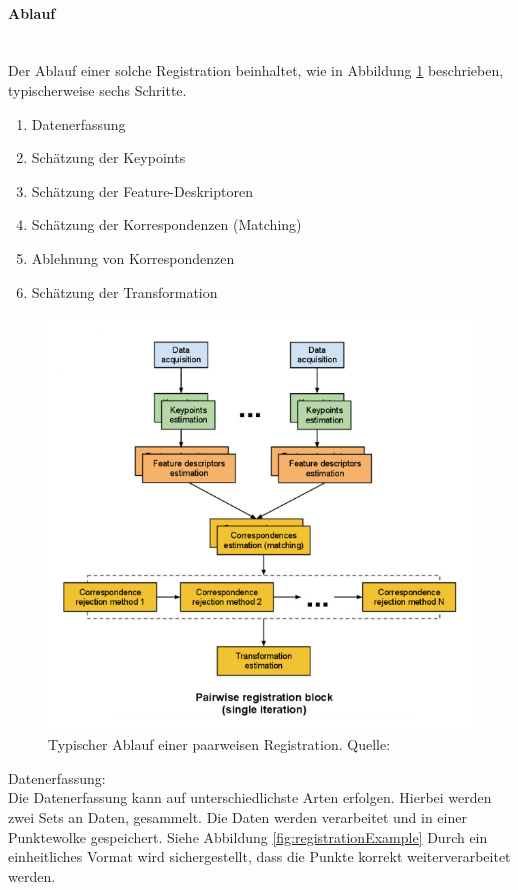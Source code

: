 \paragraph{Ablauf} \mbox{}\\
Der Ablauf einer solche Registration beinhaltet, wie in Abbildung \ref{fig:registrationAblauf} beschrieben, typischerweise sechs Schritte.
\begin{enumerate}[leftmargin=*]
    \item Datenerfassung
    \item Schätzung der Keypoints
    \item Schätzung der Feature-Deskriptoren
    \item Schätzung der Korrespondenzen (Matching)
    \item Ablehnung von Korrespondenzen
    \item Schätzung der Transformation
\end{enumerate}

\begin{figure}[H]
    \centering
    \includegraphics[width=12cm]{graphics/registration_ablauf.png}
    \caption{Typischer Ablauf einer paarweisen Registration. Quelle: \cite{pcl2023}}
    \label{fig:registrationAblauf}
\end{figure}

Datenerfassung: \\
Die Datenerfassung kann auf unterschiedlichste Arten erfolgen.
Hierbei werden zwei Sets an Daten, gesammelt.
Die Daten werden verarbeitet und in einer Punktewolke gespeichert. Siehe Abbildung \ref{fig:registrationExample}
Durch ein einheitliches Vormat wird sichergestellt, dass die Punkte korrekt weiterverarbeitet werden.
\newline

